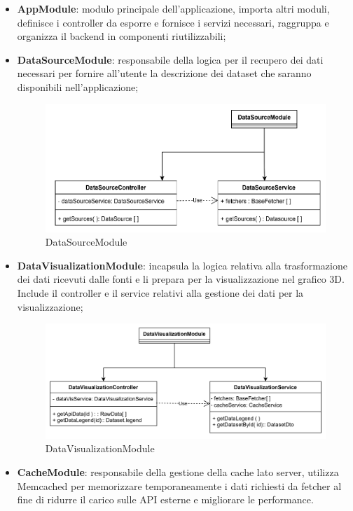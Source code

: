 \begin{itemize}
    \item \textbf{AppModule}: modulo principale dell'applicazione, importa altri moduli, definisce i controller da esporre e fornisce i servizi necessari, raggruppa e organizza il backend in componenti riutilizzabili;
    \item \textbf{DataSourceModule}: responsabile della logica per il recupero dei dati necessari per fornire all'utente la descrizione dei dataset che saranno disponibili nell'applicazione;
    \begin{figure}[h!] \centering       
        \includegraphics[scale = 0.5]{template/images/uml_back/DataSourceModule.png}
        \caption{DataSourceModule}
    \end{figure}
    \item \textbf{DataVisualizationModule}: incapsula la logica relativa alla trasformazione dei dati ricevuti dalle fonti e li prepara per la visualizzazione nel grafico 3D. Include il controller e il service relativi alla gestione dei dati per la visualizzazione;
    \begin{figure}[h!] \centering       
        \includegraphics[scale = 0.3]{template/images/uml_back/DataVisualizationModule.png}
        \caption{DataVisualizationModule}
    \end{figure}
    \newpage
    \item \textbf{CacheModule}: responsabile della gestione della cache lato server, utilizza Memcached per memorizzare temporaneamente i dati richiesti da fetcher al fine di ridurre il carico sulle API esterne e migliorare le performance.

\end{itemize}
